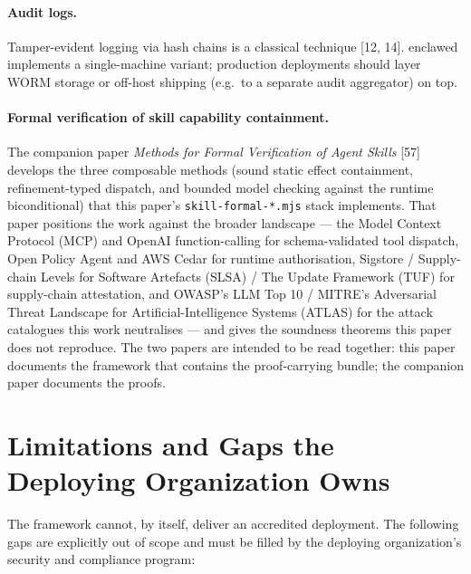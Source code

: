 \documentclass[11pt]{article}
\begin{document}
\paragraph{Audit logs.} Tamper-evident logging via hash chains is a
classical technique [12, 14]. enclawed implements a single-machine
variant; production deployments should layer WORM storage or off-host
shipping (e.g.\ to a separate audit aggregator) on top.

\paragraph{Formal verification of skill capability containment.}
The companion paper \emph{Methods for Formal Verification of Agent
Skills} [57] develops the three composable
methods (sound static effect containment, refinement-typed dispatch,
and bounded model checking against the runtime biconditional) that
this paper's \texttt{skill-formal-*.mjs} stack implements. That paper
positions the work against the broader landscape ---
the Model Context Protocol (MCP) and OpenAI function-calling for
schema-validated tool dispatch, Open Policy Agent and AWS Cedar for
runtime authorisation, Sigstore / Supply-chain Levels for Software
Artefacts (SLSA) / The Update Framework (TUF) for supply-chain
attestation, and OWASP's LLM Top 10 / MITRE's Adversarial Threat
Landscape for Artificial-Intelligence Systems (ATLAS) for the attack
catalogues this work neutralises --- and gives the soundness theorems
this paper does not reproduce. The two papers are intended to be
read together: this paper documents the framework that contains the
proof-carrying bundle; the companion paper documents the proofs.

\section{Limitations and Gaps the Deploying Organization Owns}
\label{sec:gaps}

The framework cannot, by itself, deliver an accredited deployment. The
following gaps are explicitly out of scope and must be filled by the
deploying organization's security and compliance program:
\end{document}
